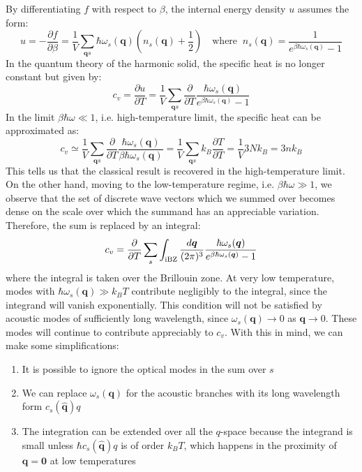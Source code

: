 \documentclass[10.75pt,a4paper,openright,bottom=2cm]{article}
\renewcommand{\Vec}[1]{\boldsymbol{#1}}
\newcommand{\RN}[1]{%
  \textup{\uppercase\expandafter{\romannumeral#1}}%
}
\begin{document}
By differentiating $f$ with respect to $\beta$, the internal energy density $u$ assumes the form:
\[
u=-\frac{\partial f}{\partial\beta}=\frac{1}{V}\sum_{\Vec{q}s}\hbar\omega_s(\Vec{q})\left(n_s(\Vec{q})+\frac{1}{2}\right) \quad \text{where}\;\; n_s(\Vec{q})=\frac{1}{e^{\beta\hbar\omega_s(\Vec{q})}-1}
\]
In the quantum theory of the harmonic solid, the specific heat is no longer constant but given by:
\[
c_v=\frac{\partial u}{\partial T}=\frac{1}{V}\sum_{\Vec{q}s}\frac{\partial}{\partial T}\frac{\hbar\omega_s(\Vec{q})}{e^{\beta\hbar\omega_s(\Vec{q})}-1}
\]
In the limit $\beta\hbar\omega\ll1$, i.e. high-temperature limit, the specific heat can be approximated as:
\[
c_v\simeq\frac{1}{V}\sum_{\Vec{q}s}\frac{\partial}{\partial T}\frac{\hbar\omega_s(\Vec{q})}{\beta\hbar\omega_s(\Vec{q})}=\frac{1}{V}\sum_{\Vec{q}s}k_B\frac{\partial T}{\partial T}=\frac{1}{V}3Nk_B=3nk_B
\]
This tells us that the classical result is recovered in the high-temperature limit. On the other hand, moving to the low-temperature regime, i.e. $\beta\hbar\omega\gg1$, we observe that the set of discrete wave vectors which we summed over becomes dense on the scale over which the summand has an appreciable variation. Therefore, the sum is replaced by an integral:
\begin{equation}
\label{general}
c_v=\frac{\partial}{\partial T}\sum_s\int_{\text{\RN{1}BZ}}\frac{d\Vec{q}}{(2\pi)^3}\frac{\hbar\omega_s(\Vec{q})}{e^{\beta\hbar\omega_s(\Vec{q})}-1}
\end{equation}
where the integral is taken over the  Brillouin zone. At very low temperature, modes with $\hbar\omega_s(\Vec{q})\gg k_BT$ contribute negligibly to the integral, since the integrand will vanish exponentially. This condition will not be satisfied by acoustic modes of sufficiently long wavelength, since $\omega_s(\Vec{q})\to0$ as $\Vec{q}\to0$. These modes will continue to contribute appreciably to $c_v$. With this in mind, we can make some simplifications:
\begin{enumerate}
    \item It is possible to ignore the optical modes in the sum over $s$
    \item We can replace $\omega_s(\Vec{q})$ for the acoustic branches with its long wavelength form $c_s(\hat{\Vec{q}})q$
    \item The integration can be extended over all the $q$-space because the integrand is small unless $\hbar c_s(\hat{\Vec{q}})q$ is of order $k_BT$, which happens in the proximity of $\Vec{q}=\Vec{0}$ at low temperatures
\end{enumerate}
\end{document}
